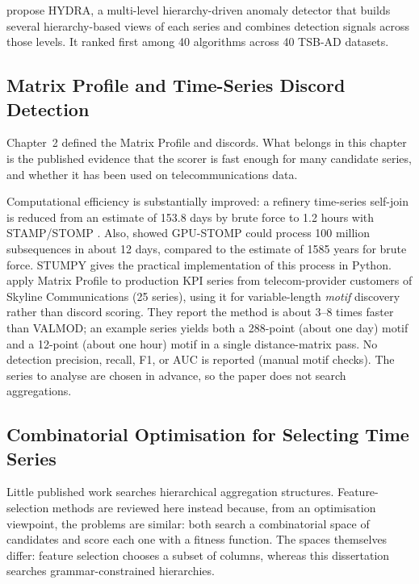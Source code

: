 \textcite{huang2026hydra} propose HYDRA, a multi-level hierarchy-driven anomaly detector that builds several hierarchy-based views of each series and combines detection signals across those levels.
It ranked first among 40 algorithms across 40 TSB-AD datasets.

\subsection{Matrix Profile and Time-Series Discord Detection}

Chapter~2 defined the Matrix Profile and discords.
What belongs in this chapter is the published evidence that the scorer is fast enough for many candidate series, and whether it has been used on telecommunications data.

Computational efficiency is substantially improved: a refinery time-series self-join is reduced from an estimate of 153.8 days by brute force to 1.2 hours with STAMP/STOMP \parencite{yeh2017timeseriesjoins}.
Also, \textcite{zhu2016matrixprofileii} showed GPU-STOMP could process 100 million subsequences in about 12 days, compared to the estimate of 1585 years for brute force.
STUMPY \parencite{law2019stumpy} gives the practical implementation of this process in Python.
\textcite{vanonsem2023motif} apply Matrix Profile to production \ac{KPI} series from telecom-provider customers of Skyline Communications (25 series), using it for variable-length \emph{motif} discovery rather than discord scoring.
They report the method is about 3--8 times faster than VALMOD; an example series yields both a 288-point (about one day) motif and a 12-point (about one hour) motif in a single distance-matrix pass.
No detection precision, recall, F1, or \ac{AUC} is reported (manual motif checks).
The series to analyse are chosen in advance, so the paper does not search aggregations.

\subsection{Combinatorial Optimisation for Selecting Time Series}

Little published work searches hierarchical aggregation structures.
Feature-selection methods are reviewed here instead because, from an optimisation viewpoint, the problems are similar: both search a combinatorial space of candidates and score each one with a fitness function.
The spaces themselves differ: feature selection chooses a subset of columns, whereas this dissertation searches grammar-constrained hierarchies.

